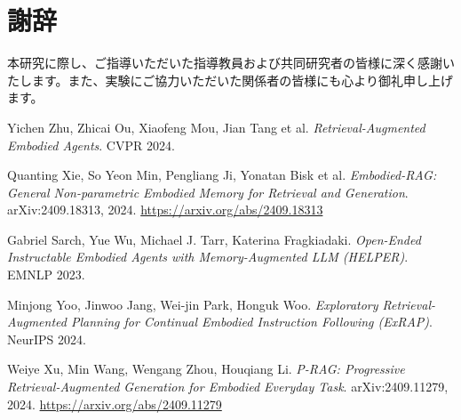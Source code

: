 \documentclass[12pt]{report}
\begin{document}
\chapter*{謝辞}

本研究に際し、ご指導いただいた指導教員および共同研究者の皆様に深く感謝いたします。また、実験にご協力いただいた関係者の皆様にも心より御礼申し上げます。

\begin{thebibliography}{99}
  \raggedright

  Yichen Zhu, Zhicai Ou, Xiaofeng Mou, Jian Tang et al.
  \textit{Retrieval-Augmented Embodied Agents}.
  CVPR 2024.

  Quanting Xie, So Yeon Min, Pengliang Ji, Yonatan Bisk et al.
  \textit{Embodied-RAG: General Non-parametric Embodied Memory for Retrieval and Generation}.
  arXiv:2409.18313, 2024. \url{https://arxiv.org/abs/2409.18313}

  Gabriel Sarch, Yue Wu, Michael J. Tarr, Katerina Fragkiadaki.
  \textit{Open-Ended Instructable Embodied Agents with Memory-Augmented LLM (HELPER)}.
  EMNLP 2023.

  Minjong Yoo, Jinwoo Jang, Wei-jin Park, Honguk Woo.
  \textit{Exploratory Retrieval-Augmented Planning for Continual Embodied Instruction Following (ExRAP)}.
  NeurIPS 2024.

  Weiye Xu, Min Wang, Wengang Zhou, Houqiang Li.
  \textit{P-RAG: Progressive Retrieval-Augmented Generation for Embodied Everyday Task}.
  arXiv:2409.11279, 2024. \url{https://arxiv.org/abs/2409.11279}

\end{thebibliography}
\end{document}
